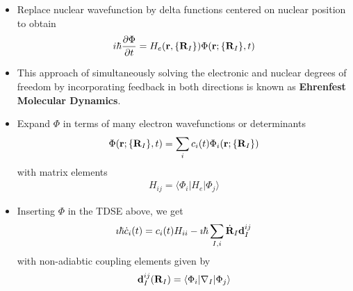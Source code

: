 \documentclass[slidestop,mathserif,compress,xcolor=svgnames]{beamer}
\begin{document}
\begin{frame}
\footnotesize{
\begin{itemize}
\item Replace nuclear wavefunction by delta functions centered on nuclear position to obtain
\begin{align*}
i\hbar\dfrac{\partial\Phi}{\partial t} = H_e({\bf r},\{{\bf R}_I\})\Phi({\bf r};\{{\bf R}_I\},t)
\end{align*}
\item This approach of simultaneously solving the electronic and nuclear degrees of freedom by incorporating feedback in both directions is known as \textbf{Ehrenfest Molecular Dynamics}.
\item Expand $\Phi$ in terms of many electron wavefunctions or  determinants
\begin{align*}
\Phi({\bf r};\{{\bf R}_I\},t) = \sum_i c_i(t)\Phi_i({\bf r};\{{\bf R}_I\})
\end{align*}
with matrix elements
\begin{align*}
H_{ij} = \langle\Phi_i|H_e|\Phi_j\rangle
\end{align*} 
\item Inserting $\Phi$ in the TDSE above, we get
\begin{align*}
\imath\hbar\dot{c}_i(t) = c_i(t)H_{ii} -\imath\hbar\sum_{I,i}\dot{\bf R}_I{\bf d}^{ij}_I
\end{align*}
with non-adiabtic coupling elements given by
\begin{align*}
{\bf d}^{ij}_I({\bf R}_I) = \langle\Phi_i|\nabla_I|\Phi_j\rangle
\end{align*}
\end{itemize}
}
\end{frame}
\end{document}
